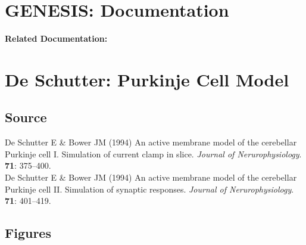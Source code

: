 \documentclass[12pt]{article}
\begin{document}
\section*{GENESIS: Documentation}

{\bf Related Documentation:}

\section*{De Schutter: Purkinje Cell Model}

\subsection*{Source}

De Schutter E \& Bower JM (1994) An active membrane model of the cerebellar Purkinje cell I. Simulation of current clamp in slice. {\it Journal of Nerurophysiology}. {\bf 71}: 375--400. \\

\noindent \noindent De Schutter E \& Bower JM (1994) An active membrane model of the cerebellar Purkinje cell II. Simulation of synaptic responses. {\it Journal of Nerurophysiology}. {\bf 71}: 401--419.

\subsection*{Figures}
\end{document}
